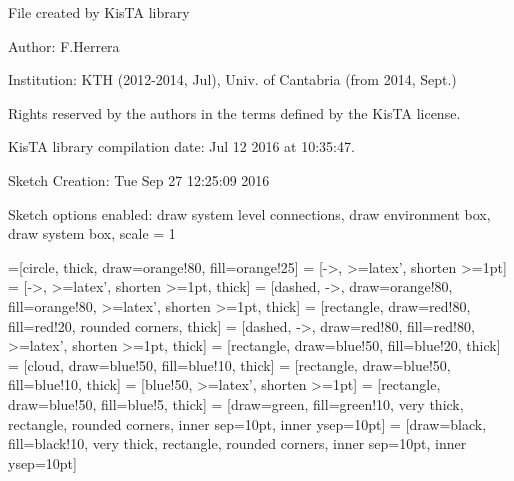 \documentclass[a4paper,10pt]{article}
\begin{document}
File created by KisTA library

Author: F.Herrera

Institution: KTH (2012-2014, Jul), Univ. of Cantabria (from 2014, Sept.)

Rights reserved by the authors in the terms defined by the KisTA license.

KisTA library compilation date: Jul 12 2016 at 10:35:47.



Sketch Creation: Tue Sep 27 12:25:09 2016


Sketch options enabled:
draw system level connections, draw environment box, draw system box, scale = 1
\hfill


=[circle, thick, draw=orange!80, fill=orange!25]
 = [->, >=latex', shorten >=1pt]
 = [->, >=latex', shorten >=1pt, thick]
 = [dashed, ->, draw=orange!80, fill=orange!80, >=latex', shorten >=1pt, thick]
 = [rectangle, draw=red!80, fill=red!20, rounded corners, thick]
 = [dashed, ->, draw=red!80, fill=red!80, >=latex', shorten >=1pt, thick]
 = [rectangle, draw=blue!50, fill=blue!20, thick]
 = [cloud, draw=blue!50, fill=blue!10, thick]
 = [rectangle, draw=blue!50, fill=blue!10, thick]
 = [blue!50, >=latex', shorten >=1pt]
 = [rectangle, draw=blue!50,  fill=blue!5, thick]
 = [draw=green, fill=green!10, very thick, rectangle, rounded corners, inner sep=10pt, inner ysep=10pt]
 = [draw=black, fill=black!10, very thick, rectangle, rounded corners, inner sep=10pt, inner ysep=10pt]
\end{document}
